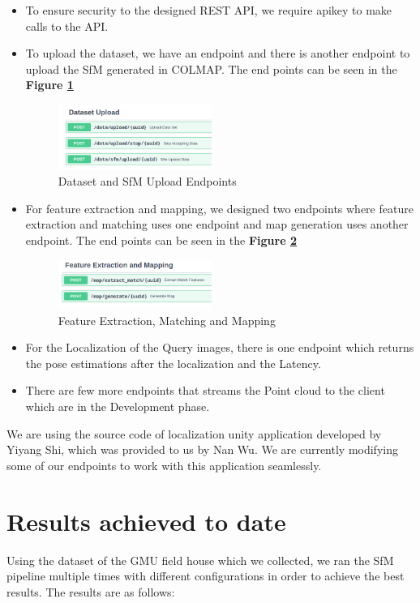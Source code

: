 \documentclass[sigconf]{acmart}
\begin{document}
\begin{itemize}
\item{To ensure security to the designed REST API, we require apikey to make calls to the API.}
\item{To upload the dataset, we have an endpoint and there is another endpoint to upload the SfM generated in COLMAP. The end points can be seen in the \textbf{Figure \ref{fig:restdataset}}
\begin{figure}[h]
  \centering
  \includegraphics[width=5cm]{images/restapi/2.png}
  \caption{Dataset and SfM Upload Endpoints}
  \label{fig:restdataset}
\end{figure}
}
\item{For feature extraction and mapping, we designed two endpoints where feature extraction and matching uses one endpoint and map generation uses another endpoint. The end points can be seen in the \textbf{Figure \ref{fig:restpipeline}}
\begin{figure}[h]
  \centering
  \includegraphics[width=5cm]{images/restapi/3.png}
  \caption{Feature Extraction, Matching and Mapping}
  \label{fig:restpipeline}
\end{figure}
}
\item{For the Localization of the Query images, there is one endpoint which returns the pose estimations after the localization and the Latency.}
\item{There are few more endpoints that streams the Point cloud to the client which are in the Development phase.}
\end{itemize}

We are using the source code of localization unity application developed by Yiyang Shi, which was provided to us by Nan Wu. We are currently modifying some of our endpoints to work with this application seamlessly. 

\section{Results achieved to date}
Using the dataset of the GMU field house which we collected, we ran the SfM pipeline multiple times with different configurations in order to achieve the best results. The results are as follows:
\end{document}
